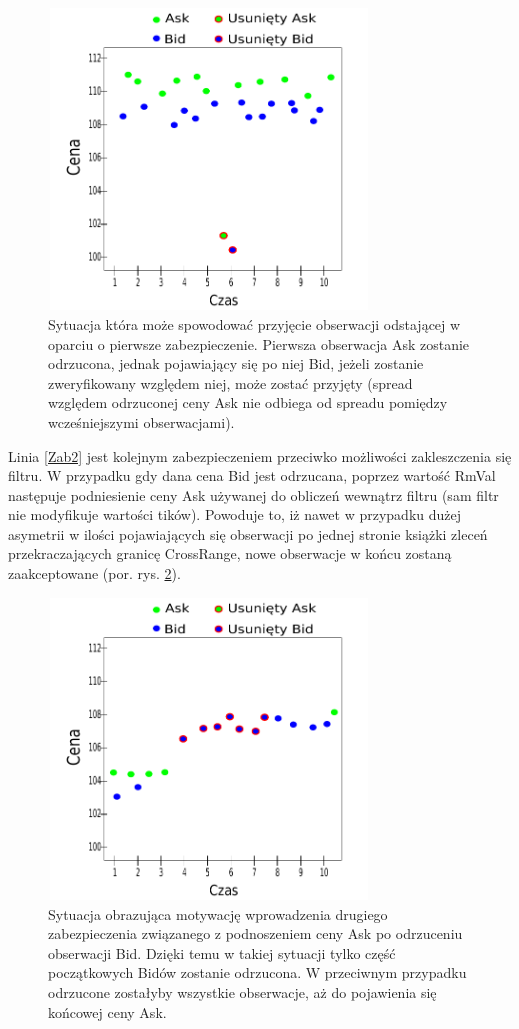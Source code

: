\documentclass[a4paper,12pt,openany, DIV=calc, headsepline]{scrbook}
\begin{document}
\begin{figure}[h]
  \centering
  \includegraphics[width=85mm, height=80mm]{wykresy/nextout}
  \caption{Sytuacja która może spowodować przyjęcie obserwacji odstającej w oparciu o pierwsze zabezpieczenie. Pierwsza obserwacja Ask zostanie odrzucona, jednak pojawiający się po niej Bid, jeżeli zostanie zweryfikowany względem niej, może zostać przyjęty (spread względem odrzuconej ceny Ask nie odbiega od spreadu pomiędzy wcześniejszymi obserwacjami).}
  \label{fig:NEXTOUT}
\end{figure}

Linia \ref{Zab2} jest kolejnym zabezpieczeniem przeciwko możliwości zakleszczenia się filtru. W przypadku gdy dana cena Bid jest odrzucana, poprzez wartość RmVal następuje  podniesienie ceny Ask używanej do obliczeń wewnątrz filtru (sam filtr nie modyfikuje wartości tików). Powoduje to, iż nawet w przypadku dużej asymetrii w ilości pojawiających się obserwacji po jednej stronie książki zleceń przekraczających granicę CrossRange, nowe obserwacje w końcu zostaną zaakceptowane (por. rys. \ref{fig:longStreak}).

\begin{figure}[h]
  \centering
  \includegraphics[width=85mm, height=80mm]{wykresy/longStreak}
  \caption{Sytuacja obrazująca motywację wprowadzenia drugiego zabezpieczenia związanego z podnoszeniem ceny Ask po odrzuceniu obserwacji Bid. Dzięki temu w takiej sytuacji tylko część początkowych Bidów zostanie odrzucona. W przeciwnym przypadku odrzucone zostałyby wszystkie obserwacje, aż do pojawienia się końcowej ceny Ask.}
  \label{fig:longStreak}
\end{figure}
\end{document}
